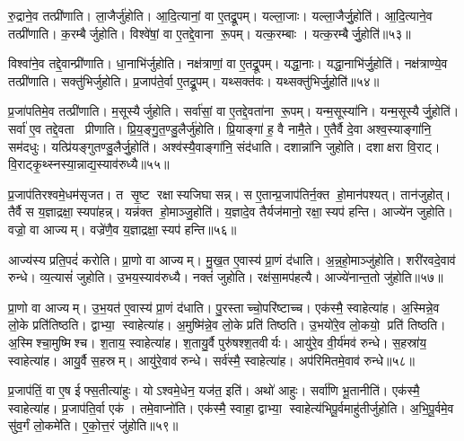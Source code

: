 रु॒द्राने॒व तत्प्री॑णाति। ला॒जैर्जु॑होति। आ॒दि॒त्यानां॒ वा ए॒तद्रू॒पम्। यल्ला॒जाः। यल्ला॒जैर्जु॒होति॑। आ॒दि॒त्याने॒व तत्प्री॑णाति। क॒रम्बैर्जुहोति। विश्वे॑षां॒ वा ए॒तद्दे॒वाना रू॒पम्। यत्क॒रम्बाः। यत्क॒रम्बैर्जु॒होति॑॥५३॥

विश्वा॑ने॒व तद्दे॒वान्प्री॑णाति। धा॒नाभि॑र्जुहोति। नक्ष॑त्राणां॒ वा ए॒तद्रू॒पम्। यद्धा॒नाः। यद्धा॒नाभि॑र्जु॒होति॑। नक्ष॑त्राण्ये॒व तत्प्री॑णाति। सक्तु॑भिर्जुहोति। प्र॒जाप॑ते॒र्वा ए॒तद्रू॒पम्। यथ्सक्त॑वः। यथ्सक्तु॑भिर्जु॒होति॑॥५४॥

प्र॒जा॑पतिमे॒व तत्प्री॑णाति। म॒सूस्यैर्जुहोति। सर्वा॑सां॒ वा ए॒तद्दे॒वता॑ना रू॒पम्। यन्म॒सूस्या॑नि। यन्म॒सूस्यैर्जु॒होति॑। सर्वा॑ ए॒व तद्दे॒वता प्रीणाति। प्रि॒य॒ङ्गु॒त॒ण्डु॒लैर्जु॑होति। प्रि॒याङ्गा॑ ह॒ वै नामै॒ते। ए॒तैर्वै दे॒वा अश्व॒स्याङ्गा॑नि॒ सम॑दधुः। यत्प्रि॑यङ्गुतण्डु॒लैर्जु॒होति॑। अश्व॑स्यै॒वाङ्गा॑नि॒ संद॑धाति। दशान्ना॑नि जुहोति। दशाक्षरा वि॒राट्। वि॒राट्कृ॒थ्स्नस्या॒न्नाद्य॒स्याव॑रुध्यै॥५५॥\anuvakamend[जु॒होति॒ मधु॑ना जु॒होति॒ पृथु॑कैर्जु॒होति॑ क॒रम्बैर्जु॒होति॒ सक्तु॑भिर्जु॒होति॑ प्रियङ्गुतण्डु॒लैर्जु॒होति॑ च॒त्वारि॑ च (अ॒न्नहो॒मानाज्ये॑ना॒ग्नेर्मधु॑ना तण़्डु॒लैः पृथु॑कैर्ला॒जैः क॒रम्बैर्धा॒नाभि॒ सक्तु॑भिर्म॒सूस्यै प्रियङ्गुतण्डु॒लैर्द॒शान्ना॑नि॒ द्वाद॑श। )]

प्र॒जाप॑तिरश्वमे॒धम॑सृजत। त सृ॒ष्ट रक्षास्यजिघासन्न्। स ए॒तान्प्र॒जाप॑तिर्न॒क्त हो॒मान॑पश्यत्। तान॑जुहोत्। तैर्वै स य॒ज्ञाद्रक्षा॒स्यपा॑हन्न्। यन्न॑क्त हो॒माञ्जु॒होति॑। य॒ज्ञादे॒व तैर्यज॑मानो॒ रक्षा॒स्यप॑ हन्ति। आज्ये॑न जुहोति। वज्रो॒ वा आज्यम्। वज्रे॑णै॒व य॒ज्ञाद्रक्षा॒स्यप॑ हन्ति॥५६॥

आज्य॑स्य प्रति॒पदं॑ करोति। प्रा॒णो वा आज्यम्। मु॒ख॒त ए॒वास्य॑ प्रा॒णं द॑धाति। अ॒न्न॒हो॒माञ्जु॑होति। शरी॑रवदे॒वाव॑ रुन्धे। व्य॒त्यासं॑ जुहोति। उ॒भय॒स्याव॑रुध्यै। नक्तं॑ जुहोति। रक्ष॑सा॒मप॑हत्यै। आज्ये॑नान्त॒तो जु॑होति॥५७॥

प्रा॒णो वा आज्यम्। उ॒भ॒यत॑ ए॒वास्य॑ प्रा॒णं द॑धाति। पु॒रस्ताच्चो॒परि॑ष्टाच्च। एक॑स्मै॒ स्वाहेत्या॑ह। अ॒स्मिन्ने॒व लो॒के प्रति॑तिष्ठति। द्वाभ्या॒ स्वाहेत्या॑ह। अ॒मुष्मि॑न्ने॒व लो॒के प्रति॑ तिष्ठति। उ॒भयो॑रे॒व लो॒कयो॒ प्रति॑ तिष्ठति। अ॒स्मिश्चा॒मुष्मिश्च। श॒ताय॒ स्वाहेत्या॑ह। श॒तायु॒र्वै पुरु॑षश्श॒तवीर्यः। आयु॑रे॒व वी॒र्य॑मव॑ रुन्धे। स॒हस्रा॑य॒ स्वाहेत्या॑ह। आयु॒र्वै स॒हस्रम्। आयु॑रे॒वाव॑ रुन्धे। सर्व॑स्मै॒ स्वाहेत्या॑ह। अप॑रिमितमे॒वाव॑ रुन्धे॥५८॥\anuvakamend[ए॒व य॒ज्ञाद्रक्षा॒स्यप॑हन्त्यन्त॒तो जु॑होति श॒ताय॒ स्वाहेत्या॑ह स॒प्त च॑]

प्र॒जाप॑तिं॒ वा ए॒ष ईफ्स॒तीत्या॑हुः। योऽश्वमे॒धेन॒ यज॑त॒ इति॑। अथो॑ आहुः। सर्वा॑णि भू॒तानीति॑। एक॑स्मै॒ स्वाहेत्या॑ह। प्र॒जाप॑ति॒र्वा एक॑। तमे॒वाप्नो॑ति। एक॑स्मै॒ स्वाहा॒ द्वाभ्या॒ स्वाहेत्य॑भिपू॒र्वमाहु॑तीर्जुहोति। अ॒भि॒पू॒र्वमे॒व सु॑व॒र्गं लो॒कमे॑ति। ए॒को॒त्त॒रं जु॑होति॥५९॥

